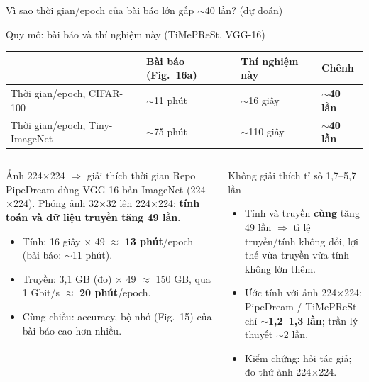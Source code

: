 \documentclass[10pt,aspectratio=169]{beamer}
\newcommand{\highlight}[1]{\textcolor{accent}{\bfseries #1}}
\begin{document}
\begin{frame}{Vì sao thời gian/epoch của bài báo lớn gấp $\sim$40 lần? (dự đoán)}
\begin{uitbox}{\faBalanceScale\; Quy mô: bài báo và thí nghiệm này (TiMePReSt, VGG-16)}
\scriptsize
\setlength{\tabcolsep}{4pt}
\renewcommand{\arraystretch}{1.1}
\begin{tabular}{@{}L{4.8cm}L{3.3cm}L{3.0cm}L{1.4cm}@{}}
\toprule
 & \textbf{Bài báo} (Fig.~16a) & \textbf{Thí nghiệm này} & \textbf{Chênh} \\
\midrule
Thời gian/epoch, CIFAR-100 & $\sim$11 phút & $\sim$16 giây & \highlight{$\sim$40 lần} \\
Thời gian/epoch, Tiny-ImageNet & $\sim$75 phút & $\sim$110 giây & \highlight{$\sim$40 lần} \\
\bottomrule
\end{tabular}
\end{uitbox}
\vspace{-0.3cm}
\begin{columns}[T]
\begin{accentbox}{\faSearch\; Ảnh 224$\times$224 $\Rightarrow$ giải thích thời gian}
\scriptsize
Repo PipeDream dùng VGG-16 bản ImageNet (224$\times$224). Phóng ảnh 32$\times$32 lên 224$\times$224: \textbf{tính toán và dữ liệu truyền tăng 49 lần}.
\begin{itemize}
  \item Tính: 16 giây $\times$ 49 $\approx$ \textbf{13 phút}/epoch (bài báo: $\sim$11 phút).
  \item Truyền: 3,1 GB (đo) $\times$ 49 $\approx$ 150 GB, qua 1 Gbit/s $\approx$ \textbf{20 phút}/epoch.
  \item Cùng chiều: accuracy, bộ nhớ (Fig.~15) của bài báo cao hơn nhiều.
\end{itemize}
\end{accentbox}
\begin{uitbox}{\faExclamationTriangle\; Không giải thích tỉ số 1,7--5,7 lần}
\scriptsize
\begin{itemize}
  \item Tính và truyền \textbf{cùng} tăng 49 lần $\Rightarrow$ tỉ lệ truyền/tính không đổi, lợi thế vừa truyền vừa tính không lớn thêm.
  \item Ước tính với ảnh 224$\times$224: PipeDream / TiMePReSt chỉ $\sim$\textbf{1,2--1,3 lần}; trần lý thuyết $\sim$2 lần.
  \item Kiểm chứng: hỏi tác giả; đo thử ảnh 224$\times$224.
\end{itemize}
\end{uitbox}
\end{columns}
\end{frame}
\end{document}
